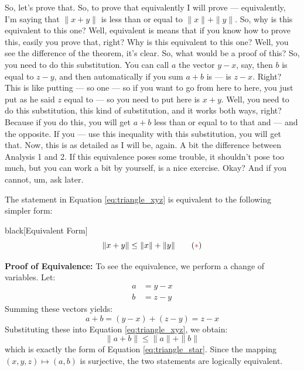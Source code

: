 \begin{spoken-clean}[00:26:37 - 00:29:18]
So, let's prove that. So, to prove that equivalently I will prove --- equivalently, I'm saying that $\|x + y\|$ is less than or equal to $\|x\| + \|y\|$.  So, why is this equivalent to this one? Well, equivalent is means that if you know how to prove this, easily you prove that, right? Why is this equivalent to this one? Well, you see the difference of the theorem, it's clear. So, what would be a proof of this? So, you need to do this substitution. You can call $a$ the vector $y - x$, say, then $b$ is equal to $z - y$, and then automatically if you sum $a + b$ is --- is $z - x$. Right?  This is like putting --- so one --- so if you want to go from here to here, you just put as he said $z$ equal to --- so you need to put here is $x + y$. Well, you need to do this substitution, this kind of substitution, and it works both ways, right? Because if you do this, you will get $a + b$ less than or equal to to that and --- and the opposite. If you --- use this inequality with this substitution, you will get that. Now, this is as detailed as I will be, again. A bit the difference between Analysis 1 and 2. If this equivalence poses some trouble, it shouldn't pose too much, but you can work a bit by yourself, is a nice exercise. Okay? And if you cannot, um, ask later.
\end{spoken-clean}

\begin{math-stroke}
The statement in Equation \ref{eq:triangle_xyz} is equivalent to the following simpler form:
\begin{color-box}{black}[Equivalent Form]
\begin{equation} \label{eq:triangle_star}
\|x + y\| \le \|x\| + \|y\| \tag{\textcolor{BrickRed}{$\ast$}}
\end{equation}
\end{color-box}

\textbf{Proof of Equivalence:}
To see the equivalence, we perform a change of variables. Let:
\begin{align*}
a &= y - x \\
b &= z - y
\end{align*}
Summing these vectors yields:
\[ a + b = (y - x) + (z - y) = z - x \]
Substituting these into Equation \ref{eq:triangle_xyz}, we obtain:
\[ \|a + b\| \le \|a\| + \|b\| \]
which is exactly the form of Equation \ref{eq:triangle_star}. Since the mapping $(x, y, z) \mapsto (a, b)$ is surjective, the two statements are logically equivalent.
\end{math-stroke}

